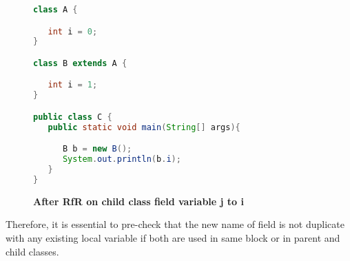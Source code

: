 \begin{figure}[th]
\centering
\begin{minipage}[t]{0.75\linewidth}
\begin{lstlisting}[language=java, basicstyle=\scriptsize\ttfamily,frame=single]
class A {

   int i = 0;
}

class B extends A {

   int i = 1; 
}

public class C {
   public static void main(String[] args){

      B b = new B();
      System.out.println(b.i);
   }
}
\end{lstlisting}
\end{minipage}
\caption{\textbf{After RfR on child class field variable j to i}}
\label{figure:afterRfR}
\end{figure}

Therefore, it is essential to pre-check that the new name of field is not duplicate with any existing local variable if both are used in same block or in parent and child classes. 